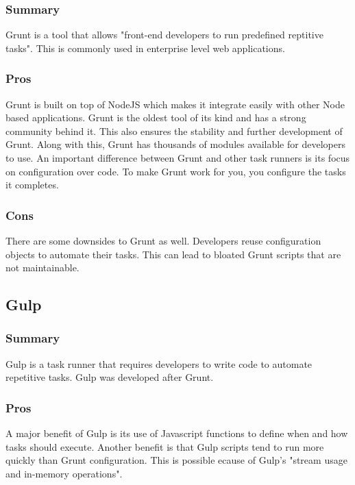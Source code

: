 \documentclass[draftclsnofoot,onecolumn,letterpaper,10pt,compsoc]{IEEEtran}
\begin{document}
		        \subsubsection{Summary}
		            Grunt is a tool that allows "front-end developers to run predefined reptitive tasks"\cite{TaskRunners}. This is commonly used in enterprise level web applications.

		        \subsubsection{Pros}
		            Grunt is built on top of NodeJS which makes it integrate easily with other Node based applications.
		            Grunt is the oldest tool of its kind and has a strong community behind it.
		            This also ensures the stability and further development of Grunt.
		            Along with this, Grunt has thousands of modules available for developers to use.
		            An important difference between Grunt and other task runners is its focus on configuration over code.
		            To make Grunt work for you, you configure the tasks it completes.

		        \subsubsection{Cons}
		            There are some downsides to Grunt as well.
		            Developers reuse configuration objects to automate their tasks.
		            This can lead to bloated Grunt scripts that are not maintainable\cite{TaskRunners}.

			\subsection{Gulp}
		        \subsubsection{Summary}
		            Gulp is a task runner that requires developers to write code to automate repetitive tasks\cite{TaskRunners}.
		            Gulp was developed after Grunt.

		        \subsubsection{Pros}
		            A major benefit of Gulp is its use of Javascript functions to define when and how tasks should execute.
		            Another benefit is that Gulp scripts tend to run more quickly than Grunt configuration\cite{GulpGruntSpeed}.
		            This is possible ecause of Gulp's "stream usage and in-memory operations"\cite{TaskRunners}.
\end{document}

